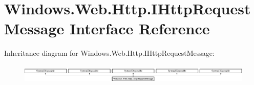 \hypertarget{interface_windows_1_1_web_1_1_http_1_1_i_http_request_message}{}\section{Windows.\+Web.\+Http.\+I\+Http\+Request\+Message Interface Reference}
\label{interface_windows_1_1_web_1_1_http_1_1_i_http_request_message}
Inheritance diagram for Windows.\+Web.\+Http.\+I\+Http\+Request\+Message\+:\begin{figure}[H]
\begin{center}
\leavevmode
\includegraphics[height=0.899598cm]{interface_windows_1_1_web_1_1_http_1_1_i_http_request_message}
\end{center}
\end{figure}
